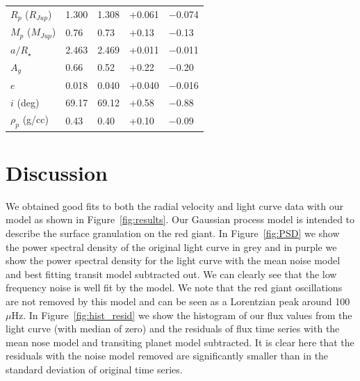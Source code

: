 \documentclass[apjl]{emulateapj}
\begin{document}
\begin{table}
\begin{tabular}{l l l l l}
%
$R_{p}$ ($R_{Jup}$) 	&	1.300		&	1.308		&	+0.061		&	$-$0.074		\\
$M_{p}$ ($M_{Jup}$)	&	0.76			&	0.73			&	+0.13		&	$-$0.13		\\
$a/R_{\star}$			&	2.463		&	2.469		&	+0.011		&	$-$0.011		\\
$A_g$				&	0.66			&	0.52			&	+0.22		&	$-$0.20		\\
$e$					&	0.018		&	0.040		&	+0.040		&	$-$0.016		\\
$i$ (deg)				&	69.17		&	69.12		&	+0.58		&	$-$0.88		\\
$\rho_{p}$ (g/cc) 		&	0.43			&	0.40			&	+0.10		&	$-$0.09		\\
\hline
\end{tabular}
\end{table}


\section{Discussion}
We obtained good fits to both the radial velocity and light curve data with our model as shown in Figure~\ref{fig:results}. Our Gaussian process model is intended to describe the surface granulation on the red giant. In Figure~\ref{fig:PSD} we show the power spectral density of the original light curve in grey and in purple we show the power spectral density for the light curve with the mean noise model and best fitting transit model subtracted out. We can clearly see that the low frequency noise is well fit by the model. We note that the red giant oscillations are not removed by this model and can be seen as a Lorentzian peak around 100 $\mu$Hz. In Figure~\ref{fig:hist_resid} we show the histogram of our flux values from the light curve (with median of zero) and the residuals of flux time series with the mean nose model and transiting planet model subtracted. It is clear here that the residuals with the noise model removed are significantly smaller than in the standard deviation of original time series.
\end{document}
